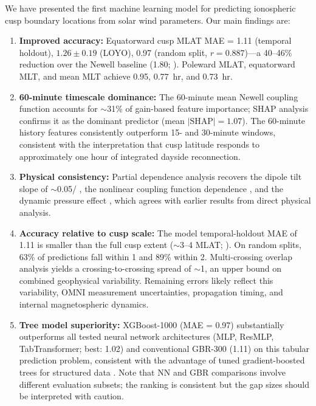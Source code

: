 \documentclass[draft]{agujournal2019}
\let\citep\cite
\let\citealt\citeNP
\let\citealp\citeNP
\begin{document}
We have presented the first machine learning model for predicting ionospheric cusp boundary locations from solar wind parameters. Our main findings are:

\begin{enumerate}
\item \textbf{Improved accuracy:} Equatorward cusp MLAT MAE = 1.11\textdegree{} (temporal holdout), $1.26 \pm 0.19$\textdegree{} (LOYO), 0.97\textdegree{} (random split, $r = 0.887$)---a 40--46\% reduction over the Newell baseline (1.80\textdegree; \citealt{newell2006cusp}). Poleward MLAT, equatorward MLT, and mean MLT achieve 0.95\textdegree, 0.77~hr, and 0.73~hr.

\item \textbf{60-minute timescale dominance:} The 60-minute mean Newell coupling function accounts for $\sim$31\% of gain-based feature importance; SHAP analysis confirms it as the dominant predictor (mean $|\text{SHAP}| = 1.07$\textdegree). The 60-minute history features consistently outperform 15- and 30-minute windows, consistent with the interpretation that cusp latitude responds to approximately one hour of integrated dayside reconnection.

\item \textbf{Physical consistency:} Partial dependence analysis recovers the dipole tilt slope of $\sim$0.05\textdegree/\textdegree{} \cite{newell1989tilt}, the nonlinear coupling function dependence \cite{newell2006cusp}, and the dynamic pressure effect \cite{shue1997magnetopause}, which agrees with earlier results from direct physical analysis.

\item \textbf{Accuracy relative to cusp scale:} The model temporal-holdout MAE of 1.11\textdegree{} is smaller than the full cusp extent ($\sim$3--4\textdegree{} MLAT; \citealp{zhang2013lfm}). On random splits, 63\% of predictions fall within 1\textdegree{} and 89\% within 2\textdegree{}. Multi-crossing overlap analysis yields a crossing-to-crossing spread of $\sim$1\textdegree{}, an upper bound on combined geophysical variability. Remaining errors likely reflect this variability, OMNI measurement uncertainties, propagation timing, and internal magnetospheric dynamics.

\item \textbf{Tree model superiority:} XGBoost-1000 (MAE = 0.97\textdegree{}) substantially outperforms all tested neural network architectures (MLP, ResMLP, TabTransformer; best: 1.02\textdegree{}) and conventional GBR-300 (1.11\textdegree{}) on this tabular prediction problem, consistent with the advantage of tuned gradient-boosted trees for structured data \citep{grinsztajn2022tree}. Note that NN and GBR comparisons involve different evaluation subsets; the ranking is consistent but the gap sizes should be interpreted with caution.


\end{enumerate}
\end{document}

